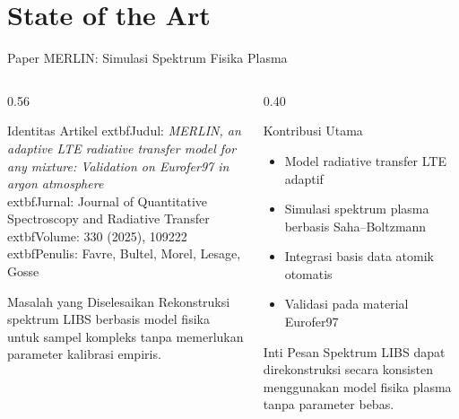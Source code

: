 \documentclass[aspectratio=169,10pt]{beamer}
\begin{document}
\section{State of the Art}

\begin{frame}{Paper MERLIN: Simulasi Spektrum Fisika Plasma}

\begin{columns}[T]

\begin{column}{0.56\textwidth}

\begin{block}{Identitas Artikel}
\small
	extbf{Judul}: \textit{MERLIN, an adaptive LTE radiative transfer model for any mixture: Validation on Eurofer97 in argon atmosphere}\\[4pt]

	extbf{Jurnal}: Journal of Quantitative Spectroscopy and Radiative Transfer\\
	extbf{Volume}: 330 (2025), 109222\\[4pt]

	extbf{Penulis}: Favre, Bultel, Morel, Lesage, Gosse
\end{block}

\begin{exampleblock}{Masalah yang Diselesaikan}
\small
Rekonstruksi spektrum LIBS berbasis model fisika untuk sampel kompleks tanpa memerlukan parameter kalibrasi empiris.
\end{exampleblock}

\end{column}

\begin{column}{0.40\textwidth}

\begin{block}{Kontribusi Utama}
\small
\begin{itemize}
\item Model radiative transfer LTE adaptif
\item Simulasi spektrum plasma berbasis Saha--Boltzmann
\item Integrasi basis data atomik otomatis
\item Validasi pada material Eurofer97
\end{itemize}
\end{block}

\begin{alertblock}{Inti Pesan}
\small
Spektrum LIBS dapat direkonstruksi secara konsisten menggunakan model fisika plasma tanpa parameter bebas.
\end{alertblock}

\end{column}

\end{columns}

\end{frame}
\end{document}
